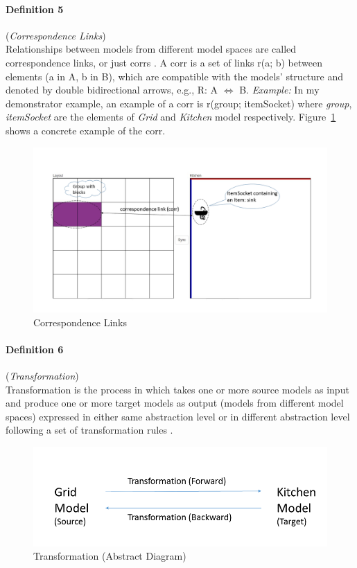 \paragraph{Definition 5} (\textit{Correspondence Links})\\
Relationships between models from different model spaces are called correspondence links, or just corrs \cite{benchmarx-reload}. A corr is a set of links  r(a; b) between elements (a in A, b in B), which are compatible with the models' structure and denoted by double bidirectional arrows, e.g., R: A $\Longleftrightarrow$ B. 
\newline\newline\textit{Example:} In my demonstrator example, an example of a corr is r(group; itemSocket) where \textit{group}, \textit{itemSocket} are the elements of \textit{Grid} and \textit{Kitchen} model respectively. Figure~\ref{fig:Correspondence_Links} shows a concrete example of the corr.
\begin{figure}
	\includegraphics[width=1\textwidth]{figures/Corr}
	\caption{Correspondence Links}
	\label{fig:Correspondence_Links}
\end{figure}

\paragraph{Definition 6} (\textit{Transformation})\\
Transformation is the process in which takes one or more source models as input and produce one or more target models as output (models from different model spaces) expressed in either same abstraction level or in different abstraction level following a set of transformation rules \cite{modeltransform}. 

\begin{figure}
	\includegraphics[width=1\textwidth]{figures/Transformation_Abstract}
	\caption{Transformation (Abstract Diagram)}
	\label{fig:Transformation_Abstract}
\end{figure}

